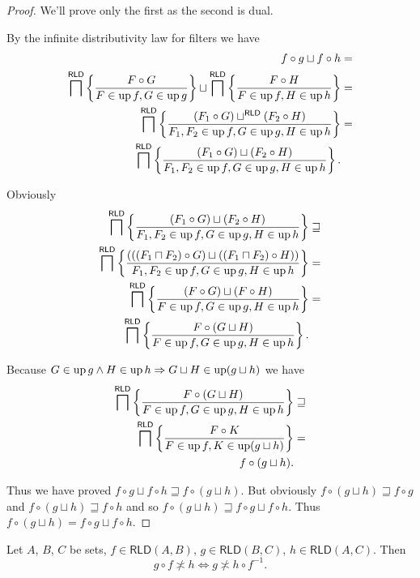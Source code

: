 \begin{proof}
We'll prove only the first as the second is dual.

By the infinite distributivity law for filters we have
\begin{align*}
f\circ g\sqcup f\circ h & =\\
\bigsqcap^{\mathsf{RLD}}\left\{ \frac{F\circ G}{F\in\operatorname{up} f,G\in\operatorname{up} g}\right\}\sqcup\bigsqcap^{\mathsf{RLD}}\left\{ \frac{F\circ H}{F\in\operatorname{up} f,H\in\operatorname{up} h}\right\} & =\\
\bigsqcap^{\mathsf{RLD}}\left\{ \frac{(F_{1}\circ G)\sqcup^{\mathsf{RLD}}(F_{2}\circ H)}{F_{1},F_{2}\in\operatorname{up} f,G\in\operatorname{up} g,H\in\operatorname{up} h}\right\} & =\\
\bigsqcap^{\mathsf{RLD}}\left\{ \frac{(F_{1}\circ G)\sqcup(F_{2}\circ H)}{F_{1},F_{2}\in\operatorname{up} f,G\in\operatorname{up} g,H\in\operatorname{up} h}\right\}.
\end{align*}


Obviously
\begin{align*}
\bigsqcap^{\mathsf{RLD}}\left\{ \frac{(F_{1}\circ G)\sqcup(F_{2}\circ H)}{F_{1},F_{2}\in\operatorname{up} f,G\in\operatorname{up} g,H\in\operatorname{up} h}\right\} & \sqsupseteq\\
\bigsqcap^{\mathsf{RLD}}\left\{ \frac{(((F_{1}\sqcap F_{2})\circ G)\sqcup((F_{1}\sqcap F_{2})\circ H))}{F_{1},F_{2}\in\operatorname{up} f,G\in\operatorname{up} g,H\in\operatorname{up} h}\right\} & =\\
\bigsqcap^{\mathsf{RLD}}\left\{ \frac{(F\circ G)\sqcup(F\circ H)}{F\in\operatorname{up} f,G\in\operatorname{up} g,H\in\operatorname{up} h}\right\} & =\\
\bigsqcap^{\mathsf{RLD}}\left\{ \frac{F\circ(G\sqcup H)}{F\in\operatorname{up} f,G\in\operatorname{up} g,H\in\operatorname{up} h}\right\}.
\end{align*}


Because $G\in\operatorname{up} g\land H\in\operatorname{up} h\Rightarrow G\sqcup H\in\operatorname{up}(g\sqcup h)$
we have
\begin{align*}
\bigsqcap^{\mathsf{RLD}}\left\{ \frac{F\circ(G\sqcup H)}{F\in\operatorname{up} f,G\in\operatorname{up} g,H\in\operatorname{up} h}\right\} & \sqsupseteq\\
\bigsqcap^{\mathsf{RLD}}\left\{ \frac{F\circ K}{F\in\operatorname{up} f,K\in\operatorname{up}(g\sqcup h)}\right\} & =\\
f\circ(g\sqcup h).
\end{align*}


Thus we have proved $f\circ g\sqcup f\circ h\sqsupseteq f\circ(g\sqcup h)$.
But obviously $f\circ(g\sqcup h)\sqsupseteq f\circ g$ and $f\circ(g\sqcup h)\sqsupseteq f\circ h$
and so $f\circ(g\sqcup h)\sqsupseteq f\circ g\sqcup f\circ h$. Thus
$f\circ(g\sqcup h)=f\circ g\sqcup f\circ h$.\end{proof}
\begin{thm}
\label{rld-cross}Let $A$, $B$, $C$ be sets, $f\in\mathsf{RLD}(A,B)$,
$g\in\mathsf{RLD}(B,C)$, $h\in\mathsf{RLD}(A,C)$. Then
\[
g\circ f\nasymp h\Leftrightarrow g\nasymp h\circ f^{-1}.
\]
\end{thm}
